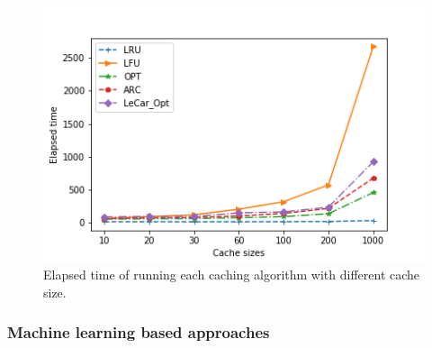\documentclass[letterpaper,twocolumn,10pt]{article}
\begin{document}
\begin{figure}[!ht]
	\centering 
	\includegraphics[width=0.38\textheight]{time.png}
	\caption{Elapsed time of running each caching algorithm with different cache size. 
}
	\label{fig:time}
\end{figure}



\begin{table}[]
\centering
{}
\caption{Ratio for LeCar\_Opt elapsed time and ARC elapsed time respect to different cache size. }
\label{tab:my-table}
\end{table}
\subsubsection{Machine learning based approaches}
\end{document}
